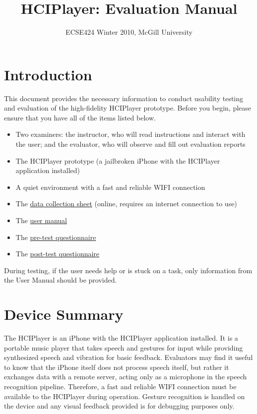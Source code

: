 \documentclass[12pt,letterpaper]{article}
\begin{document}
\title{HCIPlayer: Evaluation Manual}
\author{ECSE424 Winter 2010, McGill University}
\renewcommand{\today}{Updated: Monday, March 8th, 2010}
\maketitle

\section{Introduction}

This document provides the necessary information to conduct usability testing and evaluation of the high-fidelity HCIPlayer prototype. Before you begin, please ensure that you have all of the items listed below.

\begin{itemize}
\item Two examiners: the instructor, who will read instructions and interact with the user; and the evaluator, who will observe and fill out evaluation reports
\item The HCIPlayer prototype (a jailbroken iPhone with the HCIPlayer application installed)
\item A quiet environment with a fast and reliable WIFI connection
\item The \href{http://fluidsurveys.com/s/hciplayer-datacollectionsheet/}{data collection sheet} (online, requires an internet connection to use)
\item The \href{http://www.ece.mcgill.ca/~scormi3/hci/docs/user-manual.pdf}{user manual}
\item The \href{http://www.ece.mcgill.ca/~scormi3/hci/docs/pretest-questionnaire.pdf}{pre-test questionnaire}
\item The \href{http://www.ece.mcgill.ca/~scormi3/hci/docs/posttest-questionnaire.pdf}{post-test questionnaire}
\end{itemize}

During testing, if the user needs help or is stuck on a task, only information from the User Manual should be provided.

\section{Device Summary}

The HCIPlayer is an iPhone with the HCIPlayer application installed. It is a portable music player that takes speech and gestures for input while providing synthesized speech and vibration for basic feedback. Evaluators may find it useful to know that the iPhone itself does not process speech itself, but rather it exchanges data with a remote server, acting only as a microphone in the speech recognition pipeline. Therefore, a fast and reliable WIFI connection must be available to the HCIPlayer during operation. Gesture recognition is handled on the device and any visual feedback provided is for debugging purposes only. 
\end{document}

